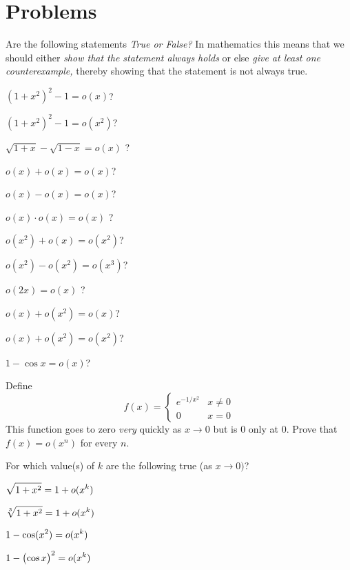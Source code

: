 \section{Problems} %

\problemfont %
\begin{multicols}{2}\noindent
{\color{darkbluegreen}%
Are the following statements \textit{True or False?} In mathematics this
means that we  should either \textit{show that the statement always
holds} or else \textit{give at least one counterexample,} thereby
showing that the statement is not always true.}

\problem \(\displaystyle (1+x^2)^2-1 =o(x) \)? %

\problem \(\displaystyle (1+x^2)^2-1 =o(x^2) \)? %

\problem \(\displaystyle \sqrt{1+x}-\sqrt{1-x} =o(x)\) ? %

\problem \(\displaystyle o(x)+o(x) =o(x) \)? %

\problem \(\displaystyle o(x)-o(x) =o(x) \)? %

\problem \(\displaystyle o(x)\cdot o(x) =o(x)\) ? %

\problem \(\displaystyle o(x^2)+o(x) =o(x^2) \)? %

\problem \(\displaystyle o(x^2)-o(x^2) =o(x^3) \)? %

\problem \(\displaystyle o(2x) =o(x)\) ? %

\problem \(\displaystyle o(x)+o(x^2)=o(x) \)? %

\problem \(\displaystyle o(x)+o(x^2)=o(x^2) \)? %

\problem \(\displaystyle 1-\cos x =o(x) \)? %

\bigskip
\problem  Define \[ %
f(x) =
\begin{cases}
  e^{-1/{x^2}} & x\neq 0 \\ 0 & x = 0
\end{cases}
\]
This function goes to zero \emph{very} quickly as $x\to0$ but
is 0 only at 0.   Prove that  $f(x) = o(x^n)$ for every $n$.

\problem For which value(s) of $k$ are the following true (as $x\to0)$? %

\subprob $\displaystyle\sqrt{1+ x^2} =1+o(x^k)$ 

\subprob $\displaystyle\sqrt[3]{1+ x^2} =1+o(x^k)$ 

\subprob $\displaystyle1-\cos (x^2) =o(x^k)$ 

\subprob $\displaystyle1-\bigl(\cos x\bigr)^2 =o(x^k)$ 


\end{multicols}
